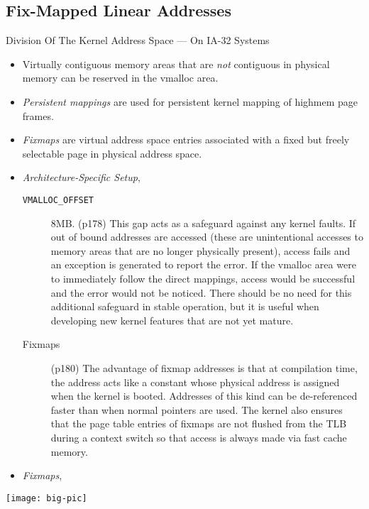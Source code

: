 \subsection{Fix-Mapped Linear Addresses}
\label{sec:fix-mapped-linear}

\begin{frame}{Division Of The Kernel Address Space}{ --- On IA-32 Systems}
  \begin{center}
  \end{center}
  \begin{itemize}
  \item Virtually contiguous memory areas that are \emph{not} contiguous in physical
    memory can be reserved in the vmalloc area.
  \item \emph{Persistent mappings} are used for persistent kernel mapping of highmem page frames.
  \item \emph{Fixmaps} are virtual address space entries associated with a fixed but
    freely selectable page in physical address space.
  \end{itemize}
\end{frame}

\begin{itemize}
\item \emph{Architecture-Specific Setup}, \cite[Sec 3.4.2]{mauerer2008professional}
  \begin{description}
  \item[\texttt{VMALLOC\_OFFSET}] 8MB. (p178) This gap acts as a safeguard against any
    kernel faults. If out of bound addresses are accessed (these are unintentional
    accesses to memory areas that are no longer physically present), access fails and an
    exception is generated to report the error. If the vmalloc area were to immediately
    follow the direct mappings, access would be successful and the error would not be
    noticed. There should be no need for this additional safeguard in stable operation,
    but it is useful when developing new kernel features that are not yet mature.
  \item[Fixmaps] (p180) The advantage of fixmap addresses is that at compilation time, the
    address acts like a constant whose physical address is assigned when the kernel is
    booted. Addresses of this kind can be de-referenced faster than when normal pointers
    are used. The kernel also ensures that the page table entries of fixmaps are not
    flushed from the TLB during a context switch so that access is always made via fast
    cache memory.
  \end{description}
\item \emph{Fixmaps}, \cite[Sec 1.8.3]{abhishek2002memory}
\end{itemize}


\begin{center}
  \texttt{[image: big-pic]}
\end{center}




